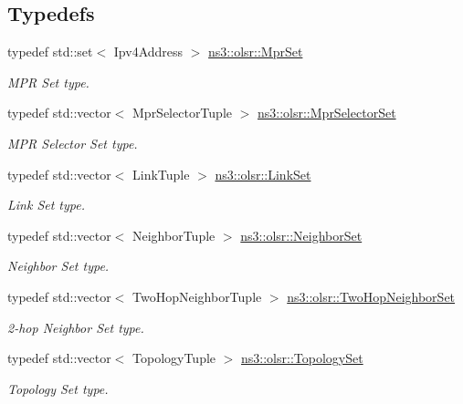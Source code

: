 \subsection*{Typedefs}
\begin{DoxyCompactItemize}
\item 
typedef std\+::set$<$ Ipv4\+Address $>$ \hyperlink{namespacens3_1_1olsr_aa7c4ede0ba85f0ea9da6e6699525bd4a}{ns3\+::olsr\+::\+Mpr\+Set}
\begin{DoxyCompactList}\small\item\em M\+PR Set type. \end{DoxyCompactList}\item 
typedef std\+::vector$<$ Mpr\+Selector\+Tuple $>$ \hyperlink{namespacens3_1_1olsr_a320f5a705b7edfac35236d3e28e10e59}{ns3\+::olsr\+::\+Mpr\+Selector\+Set}
\begin{DoxyCompactList}\small\item\em M\+PR Selector Set type. \end{DoxyCompactList}\item 
typedef std\+::vector$<$ Link\+Tuple $>$ \hyperlink{namespacens3_1_1olsr_a60381cc41d65a2e0daabd286077a378a}{ns3\+::olsr\+::\+Link\+Set}
\begin{DoxyCompactList}\small\item\em Link Set type. \end{DoxyCompactList}\item 
typedef std\+::vector$<$ Neighbor\+Tuple $>$ \hyperlink{namespacens3_1_1olsr_af0afef1f28c6f0a0b528b03b638df05d}{ns3\+::olsr\+::\+Neighbor\+Set}
\begin{DoxyCompactList}\small\item\em Neighbor Set type. \end{DoxyCompactList}\item 
typedef std\+::vector$<$ Two\+Hop\+Neighbor\+Tuple $>$ \hyperlink{namespacens3_1_1olsr_a5f9963792af7fea4dc66fb8718394604}{ns3\+::olsr\+::\+Two\+Hop\+Neighbor\+Set}
\begin{DoxyCompactList}\small\item\em 2-\/hop Neighbor Set type. \end{DoxyCompactList}\item 
typedef std\+::vector$<$ Topology\+Tuple $>$ \hyperlink{namespacens3_1_1olsr_aa5a4b5a4c916439ca513b91928d7eba0}{ns3\+::olsr\+::\+Topology\+Set}
\begin{DoxyCompactList}\small\item\em Topology Set type. \end{DoxyCompactList}\item 

\end{DoxyCompactItemize}
